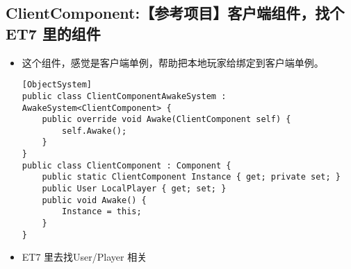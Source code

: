 \documentclass[9pt, b5paper]{article}
\begin{document}
\subsection{ClientComponent:【参考项目】客户端组件，找个ET7 里的组件}
\label{sec-9-2}
\begin{itemize}
\item 这个组件，感觉是客户端单例，帮助把本地玩家给绑定到客户端单例。
\begin{verbatim}
[ObjectSystem]
public class ClientComponentAwakeSystem : AwakeSystem<ClientComponent> {
    public override void Awake(ClientComponent self) {
        self.Awake();
    }
}
public class ClientComponent : Component {
    public static ClientComponent Instance { get; private set; }
    public User LocalPlayer { get; set; }
    public void Awake() {
        Instance = this;
    }
}
\end{verbatim}
\item ET7 里去找User/Player 相关
\end{itemize}
\end{document}
